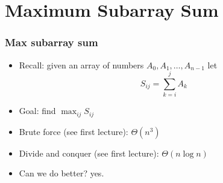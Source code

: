 \documentclass{beamer}
\begin{document}
\section{Maximum Subarray Sum}
\begin{frame}
  \frametitle{Max subarray sum}
  \begin{itemize}
  \item Recall: given an array of numbers $A_0,A_1,\ldots, A_{n-1}$ let
    \begin{displaymath}
 S_{ij}=\sum_{k=i}^{j}A_k
\end{displaymath}
\item Goal: find $\max_{ij}S_{ij}$
\item Brute force (see first lecture): $\Theta(n^3)$
\item Divide and conquer (see first lecture): $\Theta(n\log n)$
\item Can we do better? yes.
  \end{itemize}
\end{frame}
\end{document}
